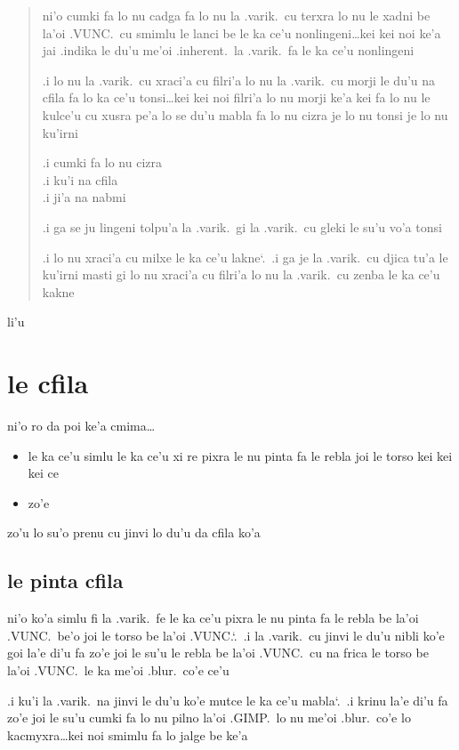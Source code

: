 \documentclass{report}
\newcommand\sds{\spacefactor\sfcode`.\ \space}
\begin{document}
\begin{quote}
	ni'o cumki fa lo nu cadga fa lo nu la .varik.\ cu terxra lo nu le xadni be la'oi .VUNC.\ cu smimlu le lanci be le ka ce'u nonlingeni\ldots kei kei noi ke'a jai .indika le du'u me'oi .inherent.\ la .varik.\ fa le ka ce'u nonlingeni

	.i lo nu la .varik.\ cu xraci'a cu filri'a lo nu la .varik.\ cu morji le du'u na cfila fa lo ka ce'u tonsi\ldots kei kei noi filri'a lo nu morji ke'a kei fa lo nu le kulce'u cu xusra pe'a lo se du'u mabla fa lo nu cizra je lo nu tonsi je lo nu ku'irni

	.i cumki fa lo nu cizra \\
	.i ku'i na cfila \\
	.i ji'a na nabmi

	.i ga se ju lingeni tolpu'a la .varik.\ gi la .varik.\ cu gleki le su'u vo'a tonsi

	.i lo nu xraci'a cu milxe le ka ce'u lakne\sds  .i ga je la .varik.\ cu djica tu'a le ku'irni masti gi lo nu xraci'a cu filri'a lo nu la .varik.\ cu zenba le ka ce'u kakne
\end{quote}

li'u

\section{le cfila}
ni'o ro da poi ke'a cmima\ldots

\begin{itemize}
	\item le ka ce'u simlu le ka ce'u xi re pixra le nu pinta fa le rebla joi le torso kei kei kei ce
	\item zo'e
\end{itemize}

zo'u lo su'o prenu cu jinvi lo du'u da cfila ko'a

\subsection{le pinta cfila}
ni'o ko'a simlu fi la .varik.\ fe le ka ce'u pixra le nu pinta fa le rebla be la'oi .VUNC.\ be'o joi le torso be la'oi .VUNC.\sds  .i la .varik.\ cu jinvi le du'u nibli ko'e goi la'e di'u fa zo'e joi le su'u le rebla be la'oi .VUNC.\ cu na frica le torso be la'oi .VUNC.\ le ka me'oi .blur.\ co'e ce'u

.i ku'i la .varik.\ na jinvi le du'u ko'e mutce le ka ce'u mabla\sds  .i krinu la'e di'u fa zo'e joi le su'u cumki fa lo nu pilno la'oi .GIMP.\ lo nu me'oi .blur.\ co'e lo kacmyxra\ldots kei noi smimlu fa lo jalge be ke'a
\end{document}

